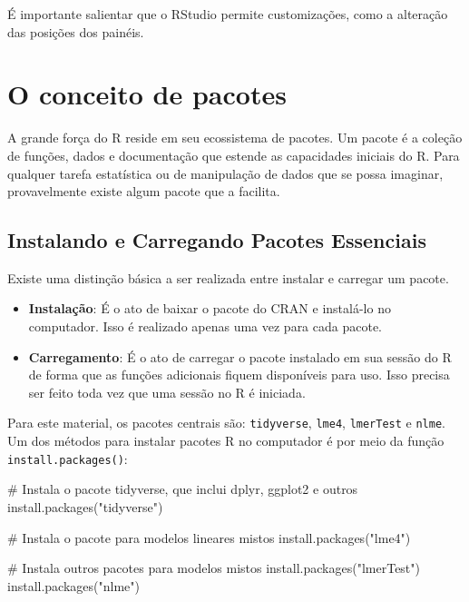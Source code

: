 \documentclass[
  12pt,
  letterpaper,
  DIV=11,
  numbers=noendperiod]{scrreprt}
\newenvironment{Shaded}{\begin{snugshade}}{\end{snugshade}}
\newcommand{\CommentTok}[1]{\textcolor[rgb]{0.37,0.37,0.37}{#1}}
\newcommand{\FunctionTok}[1]{\textcolor[rgb]{0.28,0.35,0.67}{#1}}
\newcommand{\NormalTok}[1]{\textcolor[rgb]{0.00,0.23,0.31}{#1}}
\newcommand{\StringTok}[1]{\textcolor[rgb]{0.13,0.47,0.30}{#1}}
\providecommand{\tightlist}{%
  \setlength{\itemsep}{0pt}\setlength{\parskip}{0pt}}\usepackage{longtable,booktabs,array}
\theoremstyle{definition}
\theoremstyle{exemplo}
\begin{document}
É importante salientar que o RStudio permite customizações, como a
alteração das posições dos painéis.

\section{O conceito de pacotes}\label{o-conceito-de-pacotes}

A grande força do R reside em seu ecossistema de pacotes. Um pacote é a
coleção de funções, dados e documentação que estende as capacidades
iniciais do R. Para qualquer tarefa estatística ou de manipulação de
dados que se possa imaginar, provavelmente existe algum pacote que a
facilita.

\subsection{Instalando e Carregando Pacotes
Essenciais}\label{instalando-e-carregando-pacotes-essenciais}

Existe uma distinção básica a ser realizada entre instalar e carregar um
pacote.

\begin{itemize}
\tightlist
\item
  \textbf{Instalação}: É o ato de baixar o pacote do CRAN e instalá-lo
  no computador. Isso é realizado apenas uma vez para cada pacote.
\item
  \textbf{Carregamento}: É o ato de carregar o pacote instalado em sua
  sessão do R de forma que as funções adicionais fiquem disponíveis para
  uso. Isso precisa ser feito toda vez que uma sessão no R é iniciada.
\end{itemize}

Para este material, os pacotes centrais são: \texttt{tidyverse},
\texttt{lme4}, \texttt{lmerTest} e \texttt{nlme}. Um dos métodos para
instalar pacotes R no computador é por meio da função
\texttt{install.packages()}:

\begin{Shaded}
\begin{Highlighting}[]
\CommentTok{\# Instala o pacote tidyverse, que inclui dplyr, ggplot2 e outros}
\FunctionTok{install.packages}\NormalTok{(}\StringTok{"tidyverse"}\NormalTok{)}

\CommentTok{\# Instala o pacote para modelos lineares mistos}
\FunctionTok{install.packages}\NormalTok{(}\StringTok{"lme4"}\NormalTok{)}

\CommentTok{\# Instala outros pacotes para modelos mistos}
\FunctionTok{install.packages}\NormalTok{(}\StringTok{"lmerTest"}\NormalTok{)}
\FunctionTok{install.packages}\NormalTok{(}\StringTok{"nlme"}\NormalTok{)}
\end{Highlighting}
\end{Shaded}
\end{document}
